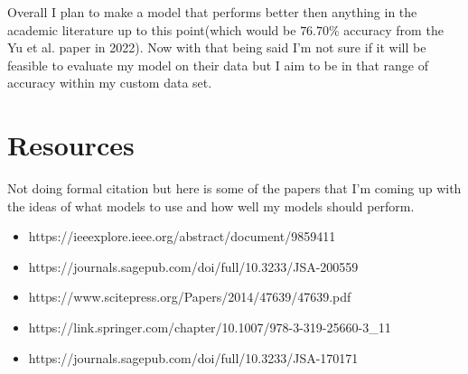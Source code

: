 \documentclass{article}
\begin{document}
Overall I plan to make a model that performs better then anything in the academic literature up to this point(which would be $76.70 \%$ accuracy from the Yu et al. paper in 2022). Now with that being said I'm not sure if it will be feasible to evaluate my model on their data but I aim to be in that range of accuracy within my custom data set.  


\section{Resources}
Not doing formal citation but here is some of the papers that I'm coming up with the ideas of what models to use and how well my models should perform.
 \begin{itemize}
\item https://ieeexplore.ieee.org/abstract/document/9859411
\item https://journals.sagepub.com/doi/full/10.3233/JSA-200559
\item https://www.scitepress.org/Papers/2014/47639/47639.pdf
\item https://link.springer.com/chapter/10.1007/978-3-319-25660-3\_11
\item https://journals.sagepub.com/doi/full/10.3233/JSA-170171
    \end{itemize}
\end{document}
